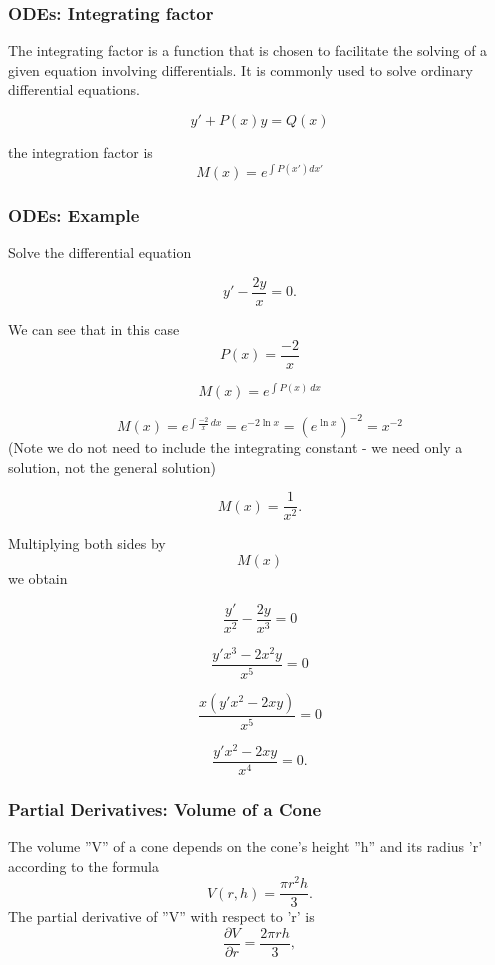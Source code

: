 \documentclass{beamer}
\begin{document}
\begin{frame}
\frametitle{ODEs: Integrating factor}
		The integrating factor is a function that is chosen to facilitate the solving of a given equation involving differentials. It is commonly used to solve ordinary differential equations.
		
		\[ y'+ P(x)y = Q(x)\]
		
		the integration factor is
		\[M(x) = e^{\int P(x') dx'}\]
		
\end{frame}
\begin{frame}		
		\frametitle{ODEs: Example}
		
		Solve the differential equation
		
		\[y'-\frac{2y}{x} = 0.\]
		
		We can see that in this case \[P(x) = \frac{-2}{x}\]
		
		\[ M(x)=e^{\int P(x)\,dx}\]
\end{frame}
\begin{frame}		
		\[ M(x)=e^{\int \frac{-2}{x}\,dx} = e^{-2 \ln x} = {(e^{\ln x})}^{-2} = x^{-2} \] (Note we do not need to include the integrating constant - we need only a solution, not the general solution)
		
		\[ M(x)=\frac{1}{x^2}.\]
\end{frame}
\begin{frame}		
		Multiplying both sides by \[M(x)\] we obtain
		
		\[\frac{y'}{x^2} - \frac{2y}{x^3} = 0\]
		
		\[\frac{y'x^3 - 2x^2y}{x^5} = 0\]
		
		\[\frac{x(y'x^2 - 2xy)}{x^5} = 0\]
		
		\[\frac{y'x^2 - 2xy}{x^4} = 0.\]
\end{frame}
\begin{frame}		
\frametitle{Partial Derivatives: Volume of a Cone}
		
		The volume ''V'' of a cone depends on the cone's height ''h'' and its radius 'r' according to the formula
		\[V(r, h) = \frac{\pi r^2 h}{3}.\]
		The partial derivative of ''V'' with respect to 'r' is
		\[\frac{ \partial V}{\partial r} = \frac{ 2 \pi r h}{3},\]
\end{frame}
\end{document}
